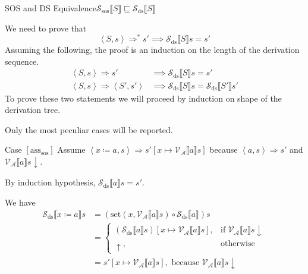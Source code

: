 \documentclass{beamer}
\newcommand{\sem}[2]{\mathcal{#1} \llbracket #2 \rrbracket}
\newcommand{\undefined}{\uparrow}
\newcommand{\defined}{\!\downarrow}
\begin{document}
\begin{frame}{SOS and DS Equivalence}{$\sem{S_\mathrm{sos}}{S} \sqsubseteq \sem{S_\mathrm{ds}}{S}$}

    \begin{overprint}
        We need to prove that
        $$\left<S, s\right> \Rightarrow^*s' \implies \sem{S_\mathrm{ds}}{S}s = s'$$
        Assuming the following, the proof is an induction on the length of the derivation sequence.
        \begin{align*}
            \left<S, s\right> \Rightarrow s'                  & \implies \sem{S_\mathrm{ds}}{S}s = s'                        \\
            \left<S, s\right> \Rightarrow \left<S', s'\right> & \implies \sem{S_\mathrm{ds}}{S}s = \sem{S_\mathrm{ds}}{S'}s'
        \end{align*}
        To prove these two statements we will proceed by induction on shape of the derivation tree.

        Only the most peculiar cases will be reported.

        \begin{block}{Case $[\mbox{ass}_{\mathrm{sos}}]$}
            Assume $\left< x \coloneq a, s \right> \Rightarrow s'[x \mapsto \sem{V_A}{a}s]$
            because $\left< a, s \right> \Rightarrow s'$ and $\sem{V_A}{a}s \defined$.
            \medskip

            By induction hypothesis, $\sem{S_\mathrm{ds}}{a}s = s'$.
            \medskip

            We have
            \begin{align*}
                \sem{S_{\mathrm{ds}}}{x \coloneq a}s & =
                (\mathrm{set}(x, \sem{V_A}{a}s) \circ \sem{S_\mathrm{ds}}{a})s                                                 \\
                                                     & =
                \begin{cases}
                    (\sem{S_\mathrm{ds}}{a}s)[x \mapsto \sem{V_A}{a}s], & \mbox{if } \sem{V_A}{a}s \defined \\
                    \undefined,                                         & \mbox{otherwise}
                \end{cases} \\
                                                     & = s'[x \mapsto \sem{V_A}{a}s], \mbox{ because } \sem{V_A}{a}s\defined
            \end{align*}
        \end{block}


\end{overprint}
\end{frame}
\end{document}
